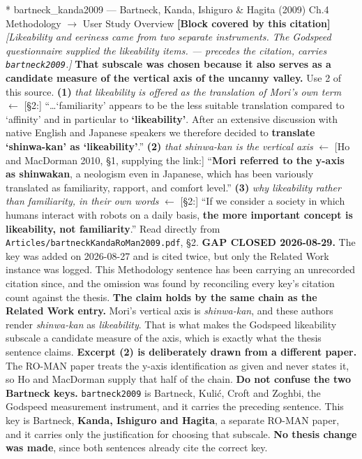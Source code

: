 \documentclass[11pt, a4paper]{article}
\makeatletter
\newcounter{citentry}
\newcommand{\citentry@core}[7]{%
  \stepcounter{citentry}
  \begingroup
  \sbox{\citentry@measurebox}{%
    \begin{minipage}{\linewidth}
      \noindent\colorbox{konstanzblue}{\parbox{\dimexpr\linewidth-2\fboxsep}{%
        \vspace{3pt}
        \textbf{\#\thecitentry \quad #2} \hfill \textit{#3}
        \vspace{3pt}
      }}
      \vspace{3pt}
      \noindent\begin{tabular}{@{}p{2.7cm} p{\dimexpr\linewidth-3cm}@{}}
        \textit{\small Sentence in thesis:} & #4 \\[5pt]
        \textbf{Usage:}\hfill       & #5 \\[5pt]
        \textit{\small Original source:}     & #6 \\[5pt]
        \textbf{How to check:}             & #7 \\
      \end{tabular}
      \vspace{5pt}
      \rule{10pt}{10pt}\quad \textbf{Validated} --- I have read the original and agree it supports the sentence.
    \end{minipage}%
  }%
  \Needspace{\dimexpr\ht\citentry@measurebox+\dp\citentry@measurebox\relax}%
  \endgroup
  \vspace{10pt}
  \noindent\colorbox{konstanzblue}{\parbox{\dimexpr\linewidth-2\fboxsep}{%
    \vspace{3pt}
    \textcolor{white}{\textbf{\#\thecitentry \quad #2}} \hfill \textcolor{white}{\textit{#3}}
    \vspace{3pt}
  }}
  \vspace{3pt}
  \noindent\begin{tabular}{@{}p{2.7cm} p{\dimexpr\linewidth-3cm}@{}}
    \textit{\small Sentence in thesis:} & \textcolor{darkgreen}{#4} \\[5pt]
    \textbf{Usage:}\hfill       & #5 \\[5pt]
    \textit{\small Original source:}     & \textcolor{darkred}{#6} \\[5pt]
    \textbf{How to check:}             & #7 \\
  \end{tabular}
  \vspace{5pt}
  \noindent\CheckBox[name=verified\thecitentry, width=10pt, height=10pt, bordercolor={0 0 0}, borderwidth=0.75, backgroundcolor={1 1 1}#1]{}\quad \textbf{Validated} --- I have read the original and agree it supports the sentence.
  \vspace{3pt}
  \noindent\textcolor{midgray}{\rule{\linewidth}{0.4pt}}
}
\newcommand{\citentry}{\@ifstar{\citentry@core{, checked}}{\citentry@core{}}}
\makeatother
\begin{document}
\begin{Form}
\citentry*
  {bartneck\_kanda2009 --- Bartneck, Kanda, Ishiguro \& Hagita (2009)}
  {Ch.4 Methodology $\rightarrow$ User Study Overview}
  {\textbf{[Block covered by this citation]} \emph{[Likeability and eeriness came from two separate instruments. The Godspeed questionnaire supplied the likeability items. --- precedes the citation, carries \texttt{bartneck2009}.]} \textbf{That subscale was chosen because it also serves as a candidate measure of the vertical axis of the uncanny valley.}}
  {Use 2 of this source.}
  {\textbf{(1)} \emph{that likeability is offered as the translation of Mori's own term} $\leftarrow$ [\S2:] ``\ldots `familiarity' appears to be the less suitable translation compared to `affinity' and in particular to \textbf{`likeability'}. After an extensive discussion with native English and Japanese speakers we therefore decided to \textbf{translate `shinwa-kan' as `likeability'}.'' \quad \textbf{(2)} \emph{that shinwa-kan is the vertical axis} $\leftarrow$ [Ho and MacDorman 2010, \S1, supplying the link:] ``\textbf{Mori referred to the y-axis as shinwakan}, a neologism even in Japanese, which has been variously translated as familiarity, rapport, and comfort level.'' \quad \textbf{(3)} \emph{why likeability rather than familiarity, in their own words} $\leftarrow$ [\S2:] ``If we consider a society in which humans interact with robots on a daily basis, \textbf{the more important concept is likeability, not familiarity}.''}
  {Read directly from \texttt{\footnotesize Articles/bartneckKandaRoMan2009.pdf}, \S2. \textbf{GAP CLOSED 2026-08-29.} The key was added on 2026-08-27 and is cited twice, but only the Related Work instance was logged. This Methodology sentence has been carrying an unrecorded citation since, and the omission was found by reconciling every key's citation count against the thesis. \textbf{The claim holds by the same chain as the Related Work entry.} Mori's vertical axis is \emph{shinwa-kan}, and these authors render \emph{shinwa-kan} as \emph{likeability}. That is what makes the Godspeed likeability subscale a candidate measure of the axis, which is exactly what the thesis sentence claims. \textbf{Excerpt (2) is deliberately drawn from a different paper.} The RO-MAN paper treats the y-axis identification as given and never states it, so Ho and MacDorman supply that half of the chain. \textbf{Do not confuse the two Bartneck keys.} \texttt{bartneck2009} is Bartneck, Kuli\'{c}, Croft and Zoghbi, the Godspeed measurement instrument, and it carries the preceding sentence. This key is Bartneck, \textbf{Kanda, Ishiguro and Hagita}, a separate RO-MAN paper, and it carries only the justification for choosing that subscale. \textbf{No thesis change was made}, since both sentences already cite the correct key.}



\end{Form}
\end{document}
